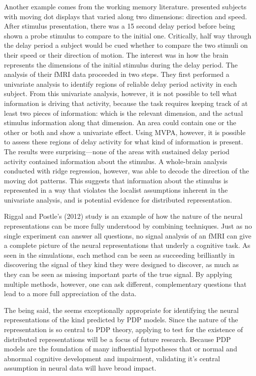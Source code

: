 Another example comes from the working memory literature.  presented subjects with moving dot displays that varied along two dimensions: direction and speed. After stimulus presentation, there was a 15 second delay period before being shown a probe stimulus to compare to the initial one. Critically, half way through the delay period a subject would be cued whether to compare the two stimuli on their speed or their direction of motion. The interest was in how the brain represents the dimensions of the initial stimulus during the delay period. The analysis of their fMRI data proceeded in two steps. They first performed a univariate analysis to identify regions of reliable delay period activity in each subject. From this univariate analysis, however, it is not possible to tell what information is driving that activity, because the task requires keeping track of at least two pieces of information: which is the relevant dimension, and the actual stimulus information along that dimension. An area could contain one or the other or both and show a univariate effect. Using MVPA, however, it is possible to assess these regions of delay activity for what kind of information is present. The results were surprising---none of the areas with sustained delay period activity contained information about the stimulus. A whole-brain analysis conducted with ridge regression, however, was able to decode the direction of the moving dot patterns. This suggests that information about the stimulus is represented in a way that violates the localist assumptions inherent in the univariate analysis, and is potential evidence for distributed representation.

Riggal and Postle's (2012) study is an example of how the nature of the neural representations can be more fully understood by combining techniques. Just as no single experiment can answer all questions, no signal analysis of an fMRI can give a complete picture of the neural representations that underly a cognitive task. As seen in the simulations, each method can be seen as succeeding brilliantly in discovering the signal of they kind they were designed to discover, as much as they can be seen as missing important parts of the true signal. By applying multiple methods, however, one can ask different, complementary questions that lead to a more full appreciation of the data.

The being said, the \soslasso seems exceptionally appropriate for identifying the neural representations of the kind predicted by PDP models. Since the nature of the representation is so central to PDP theory, applying \soslasso to test for the existence of distributed representations will be a focus of future research. Because PDP models are the foundation of many influential hypotheses that or normal and abnormal cognitive development and impairment, validating it's central assumption in neural data will have broad impact.